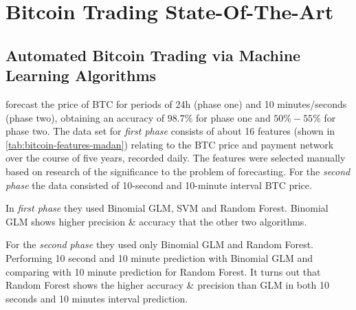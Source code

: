 
\chapter{Bitcoin Trading State-Of-The-Art} %

\label{ch:bitcoin-trading-state-of-the-art}


\section[\cite{madan_automated_2014}] {Automated Bitcoin Trading
  via Machine Learning Algorithms}

\label{sec:automated-bitcoin-trading-via-machine-learning-algorithms}

\cite{madan_automated_2014} forecast the price of BTC for periods
of 24h (phase one) and 10 minutes/seconds (phase two), obtaining an
accuracy of $98.7\%$
for phase one and $50\% - 55\%$
for phase two. The data set for \textit{first phase} consists of about
16 features (shown in \autoref{tab:bitcoin-features-madan}) relating
to the BTC price and payment network over the course of five years,
recorded daily. The features were selected manually based on research
of the significance to the problem of forecasting. For the
\textit{second phase} the data consisted of 10-second and 10-minute
interval BTC price.

In \textit{first phase} they used Binomial GLM, SVM and Random Forest.
Binomial GLM shows higher precision \& accuracy that the other two
algorithms.

For the \textit{second phase} they used only Binomial GLM and Random
Forest. Performing 10 second and 10 minute prediction with Binomial
GLM and comparing with 10 minute prediction for Random Forest. It
turns out that Random Forest shows the higher accuracy \& precision
than GLM in both 10 seconds and 10 minutes interval prediction.

